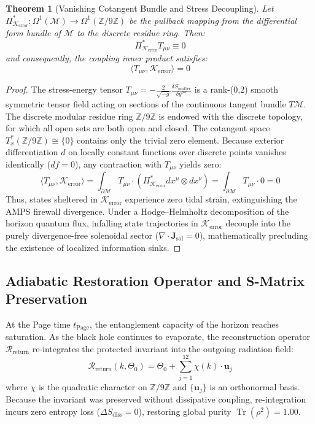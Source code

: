 \documentclass[11pt,a4paper]{article}
\newcommand{\Kerr}{\mathcal{K}_{\text{error}}}
\newtheorem{theorem}{Theorem}
\begin{document}
\begin{theorem}[Vanishing Cotangent Bundle and Stress Decoupling]
Let $\Pi_{\Kerr}^*: \Omega^1(\mathcal{M}) \to \Omega^1(\mathbb{Z}/9\mathbb{Z})$ be the pullback mapping from the differential form bundle of $\mathcal{M}$ to the discrete residue ring. Then:
\begin{equation}
\Pi_{\Kerr}^* T_{\mu\nu} \equiv 0
\end{equation}
and consequently, the coupling inner product satisfies:
\begin{equation}
\langle T_{\mu\nu}, \Kerr \rangle = 0
\end{equation}
\end{theorem}
\begin{proof}
The stress-energy tensor $T_{\mu\nu} = -\frac{2}{\sqrt{-g}}\frac{\delta S_{\text{matter}}}{\delta g^{\mu\nu}}$ is a rank-(0,2) smooth symmetric tensor field acting on sections of the continuous tangent bundle $T\mathcal{M}$. The discrete modular residue ring $\mathbb{Z}/9\mathbb{Z}$ is endowed with the discrete topology, for which all open sets are both open and closed. The cotangent space $T^*_x(\mathbb{Z}/9\mathbb{Z}) \cong \{0\}$ contains only the trivial zero element. Because exterior differentiation $d$ on locally constant functions over discrete points vanishes identically ($df = 0$), any contraction with $T_{\mu\nu}$ yields zero:
\begin{equation}
\langle T_{\mu\nu}, \Kerr \rangle = \int_{\partial \mathcal{M}} T_{\mu\nu} \cdot \left( \Pi_{\Kerr}^* dx^\mu \otimes dx^\nu \right) = \int_{\partial \mathcal{M}} T_{\mu\nu} \cdot 0 = 0
\end{equation}
Thus, states sheltered in $\Kerr$ experience zero tidal strain, extinguishing the AMPS firewall divergence. Under a Hodge--Helmholtz decomposition of the horizon quantum flux, infalling state trajectories in $\Kerr$ decouple into the purely divergence-free solenoidal sector ($\nabla \cdot \mathbf{J}_{\text{sol}} = 0$), mathematically precluding the existence of localized information sinks.
\end{proof}

\subsection{Adiabatic Restoration Operator and S-Matrix Preservation}\label{sec:restoration}
At the Page time $t_{\text{Page}}$, the entanglement capacity of the horizon reaches saturation. As the black hole continues to evaporate, the reconstruction operator $\mathcal{R}_{\text{return}}$ re-integrates the protected invariant into the outgoing radiation field:
\begin{equation}
\mathcal{R}_{\text{return}}(k, \Theta_0) = \Theta_0 + \sum_{j=1}^{12} \chi(k) \cdot \mathbf{u}_j
\end{equation}
where $\chi$ is the quadratic character on $\mathbb{Z}/9\mathbb{Z}$ and $\{\mathbf{u}_j\}$ is an orthonormal basis. Because the invariant was preserved without dissipative coupling, re-integration incurs zero entropy loss ($\Delta S_{\text{diss}} = 0$), restoring global purity $\operatorname{Tr}(\rho^2) = 1.00$.
\end{document}
